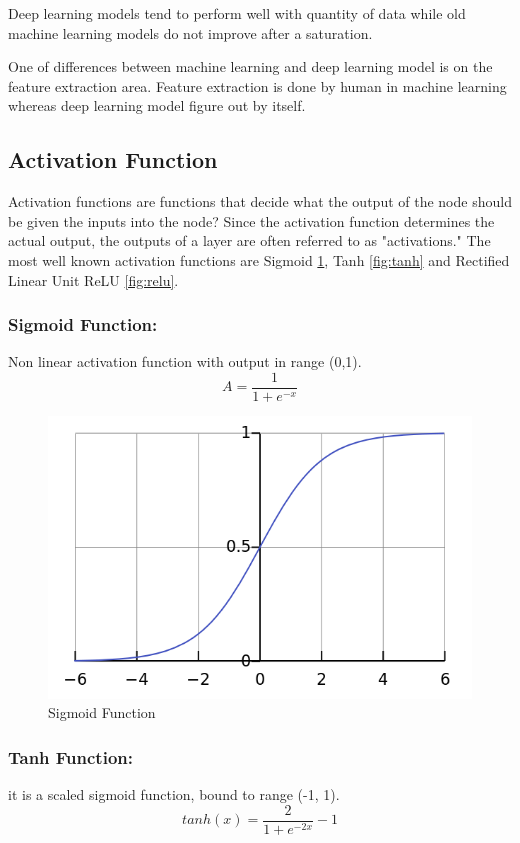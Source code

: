 \documentclass[12pt]{report}
\begin{document}
    Deep learning models tend to perform well with quantity of data while old machine 
    learning models do not improve after a saturation.

    One of differences between machine learning and deep learning model is on the feature extraction area. 
    Feature extraction is done by human in machine learning whereas deep learning model figure out by itself.

    \subsection{Activation Function}
    Activation functions are functions that decide what the output of the node should be given the inputs into the node? 
    Since the activation function determines the actual output, the outputs of a layer are often referred to as "activations."
    The most well known activation functions are Sigmoid \ref{fig:sigmoid}, Tanh \ref{fig:tanh} and
    Rectified Linear Unit ReLU \ref{fig:relu}.

    \subsubsection{Sigmoid Function:}
    Non linear activation function with output in range (0,1).
    $$ A = \frac{1}{1+e^{-x}} $$

    \begin{figure} [h]
        \centering
        \includegraphics[width=.6\textwidth]{./images/sigmoid.png}
        \caption{Sigmoid Function}
        \label{fig:sigmoid}
    \end{figure}

    \subsubsection{Tanh Function:}
     it is a scaled sigmoid function, bound to range (-1, 1).
    $$ tanh(x) = \frac{2}{1+ e^{-2x}} - 1 $$
\end{document}
